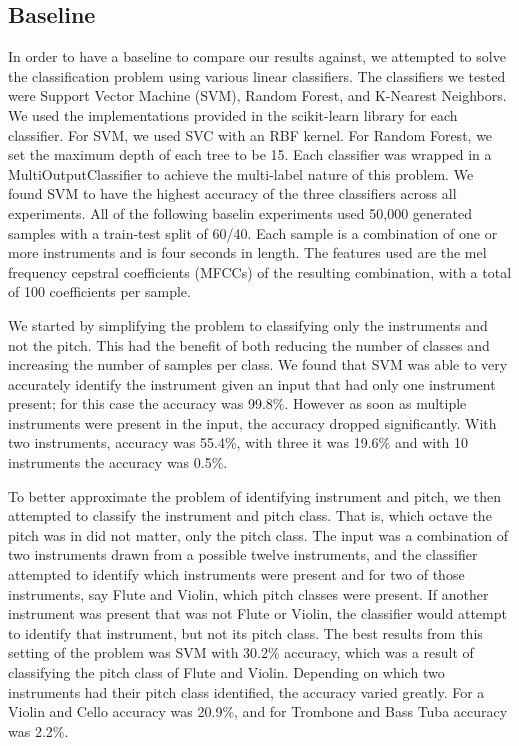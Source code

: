 \documentclass{article}
\begin{document}
\subsection{Baseline}
In order to have a baseline to compare our results against, we attempted to solve the classification problem using various linear classifiers. The classifiers we tested were Support Vector Machine (SVM), Random Forest, and K-Nearest Neighbors. We used the implementations provided in the scikit-learn library for each classifier. For SVM, we used SVC with an RBF kernel. For Random Forest, we set the maximum depth of each tree to be 15. Each classifier was wrapped in a MultiOutputClassifier to achieve the multi-label nature of this problem. We found SVM to have the highest accuracy of the three classifiers across all experiments. All of the following baselin experiments used 50,000 generated samples with a train-test split of 60/40. Each sample is a combination of one or more instruments and is four seconds in length. The features used are the mel frequency cepstral coefficients (MFCCs) of the resulting combination, with a total of 100 coefficients per sample.

We started by simplifying the problem to classifying only the instruments and not the pitch. This had the benefit of both reducing the number of classes and increasing the number of samples per class. We found that SVM was able to very accurately identify the instrument given an input that had only one instrument present; for this case the accuracy was 99.8\%. However as soon as multiple instruments were present in the input, the accuracy dropped significantly. With two instruments, accuracy was 55.4\%, with three it was 19.6\% and with 10 instruments the accuracy was 0.5\%. 

To better approximate the problem of identifying instrument and pitch, we then attempted to classify the instrument and pitch class. That is, which octave the pitch was in did not matter, only the pitch class. The input was a combination of two instruments drawn from a possible twelve instruments, and the classifier attempted to identify which instruments were present and for two of those instruments, say Flute and Violin, which pitch classes were present. If another instrument was present that was not Flute or Violin, the classifier would attempt to identify that instrument, but not its pitch class. The best results from this setting of the problem was SVM with 30.2\% accuracy, which was a result of classifying the pitch class of Flute and Violin. Depending on which two instruments had their pitch class identified, the accuracy varied greatly. For a Violin and Cello accuracy was 20.9\%, and for Trombone and Bass Tuba accuracy was 2.2\%.
\end{document}

